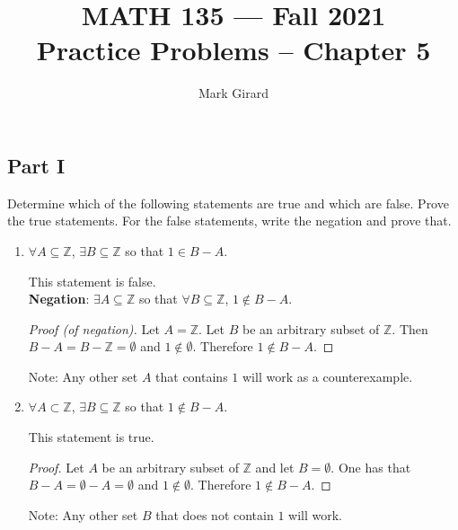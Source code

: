 \documentclass[11pt]{article}
\newcommand{\ZZ}{\mathbb{Z}}
\newif\ifshowsolution
\begin{document}
\title{MATH 135 --- Fall 2021\\ Practice Problems \ifshowsolution(Solutions)\fi -- Chapter 5}
\author{Mark Girard}

\maketitle


\subsection*{Part I}
Determine which of the following statements are true and which are false. Prove the true statements. For the false statements, write the negation and prove that. 

\begin{enumerate}%

\item $\forall A\subseteq\ZZ$, $\exists B\subseteq\ZZ$ so that $1\in B-A$.
\begin{Solution}
 This statement is false.\\
      \textbf{Negation}: $\exists A\subseteq\ZZ$ so that $\forall B\subseteq\ZZ$, $1\not\in B-A$.\\\vspace{-20pt}
      \begin{proof}[Proof \textup{(}of negation\textup{)}]
       Let $A=\ZZ$. Let $B$ be an arbitrary subset of $\ZZ$. Then $B-A = B-\ZZ = \emptyset$ and $1\not\in\emptyset$. Therefore $1\not\in B-A$.
      \end{proof}\vspace{-10pt}
      Note: Any other set $A$ that contains $1$ will work as a counterexample.
\end{Solution}

      

\item $\forall A\subset\ZZ$, $\exists B\subseteq\ZZ$ so that $1\not\in B-A$.
\begin{Solution} This statement is true.
      \begin{proof}
       Let $A$ be an arbitrary subset of $\ZZ$ and let $B=\emptyset$. One has that $B-A=\emptyset-A=\emptyset$ and  $1\not\in\emptyset$. Therefore $1\not\in B-A$.
      \end{proof}\vspace{-10pt}
      Note: Any other set $B$ that does not contain $1$ will work.
\end{Solution}


\end{enumerate}
\end{document}

